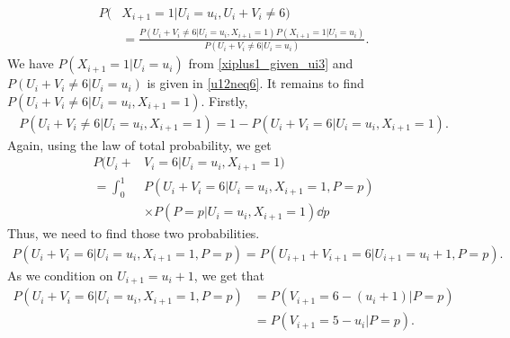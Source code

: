 \begin{equation}
\label{nextisred_given_majority}
    \begin{aligned}
        P(&X_{i+1}=1|U_i=u_i,U_i+V_i\neq6) \\[6pt]
        &= \frac{P(U_i+V_i\neq6|U_i=u_i,X_{i+1}=1)P(X_{i+1}=1|U_i=u_i)}
        {P(U_i+V_i\neq6|U_i=u_i)}.
    \end{aligned}
\end{equation}
We have $P(X_{i+1}=1|U_i=u_i)$ from \eqref{xiplus1_given_ui3} and $P(U_i+V_i\neq6|U_i=u_i)$ is given in \eqref{u12neq6}. It remains to find $P(U_i+V_i\neq6|U_i=u_i,X_{i+1}=1)$.
Firstly, 
\begin{equation*}
    \begin{aligned}
        P(U_i+V_i\neq6|U_i=u_i,X_{i+1}=1) = 1 - P(U_i+V_i=6|U_i=u_i,X_{i+1}=1).
    \end{aligned}
\end{equation*}
Again, using the law of total probability, we get
\begin{equation}
\label{u12eq6_given_nextisone}
    \begin{aligned}
        P(U_i+&V_i=6|U_i=u_i,X_{i+1}=1) \\[6pt]
        = \int_0^1 &P(U_i+V_i=6|U_i=u_i,X_{i+1}=1,P=p)\\[6pt]
        &\times P(P=p|U_i=u_i,X_{i+1}=1) \dd p
    \end{aligned}
\end{equation}
Thus, we need to find those two probabilities. 
\begin{equation*}
    \begin{aligned}
        P(U_i+V_i=6|U_i=u_i,X_{i+1}=1,P=p) 
        = P(U_{i+1}+V_{i+1}=6|U_{i+1}=u_i+1,P=p).
    \end{aligned}
\end{equation*}
As we condition on $U_{i+1}=u_i+1$, we get that
\begin{equation*}
    \begin{aligned}
        P(U_i+V_i=6|U_i=u_i,X_{i+1}=1,P=p) 
        &= P(V_{i+1}=6-(u_i+1)|P=p)\\[6pt]
        &= P(V_{i+1}=5-u_i|P=p).
    \end{aligned}
\end{equation*}

